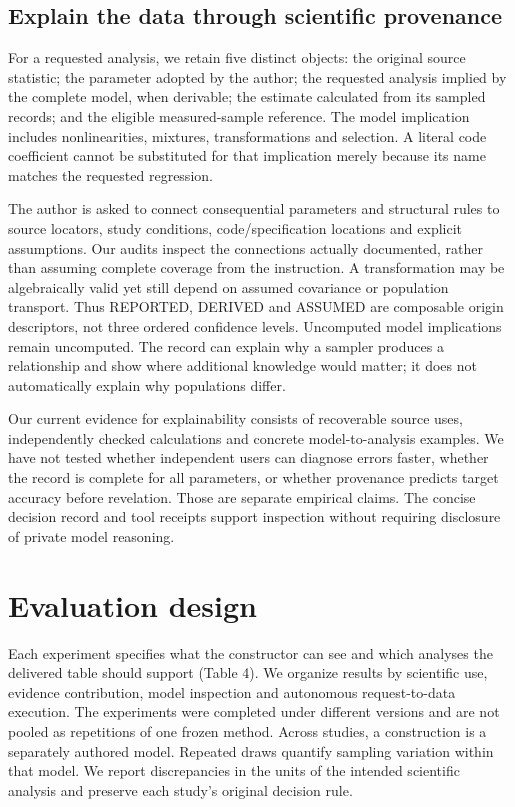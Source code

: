 \documentclass[11pt,letterpaper]{article}
\begin{document}
\subsection{Explain the data through scientific provenance}

For a requested analysis, we retain five distinct objects: the original source statistic; the parameter adopted by the author; the requested analysis implied by the complete model, when derivable; the estimate calculated from its sampled records; and the eligible measured-sample reference. The model implication includes nonlinearities, mixtures, transformations and selection. A literal code coefficient cannot be substituted for that implication merely because its name matches the requested regression.


The author is asked to connect consequential parameters and structural rules to source locators, study conditions, code/\allowbreak{}specification locations and explicit assumptions. Our audits inspect the connections actually documented, rather than assuming complete coverage from the instruction. A transformation may be algebraically valid yet still depend on assumed covariance or population transport. Thus REPORTED, DERIVED and ASSUMED are composable origin descriptors, not three ordered confidence levels. Uncomputed model implications remain uncomputed. The record can explain why a sampler produces a relationship and show where additional knowledge would matter; it does not automatically explain why populations differ.


Our current evidence for explainability consists of recoverable source uses, independently checked calculations and concrete model-to-analysis examples. We have not tested whether independent users can diagnose errors faster, whether the record is complete for all parameters, or whether provenance predicts target accuracy before revelation. Those are separate empirical claims. The concise decision record and tool receipts support inspection without requiring disclosure of private model reasoning.


\section{Evaluation design}

Each experiment specifies what the constructor can see and which analyses the delivered table should support (Table 4). We organize results by scientific use, evidence contribution, model inspection and autonomous request-to-data execution. The experiments were completed under different versions and are not pooled as repetitions of one frozen method. Across studies, a construction is a separately authored model. Repeated draws quantify sampling variation within that model. We report discrepancies in the units of the intended scientific analysis and preserve each study's original decision rule.
\end{document}
